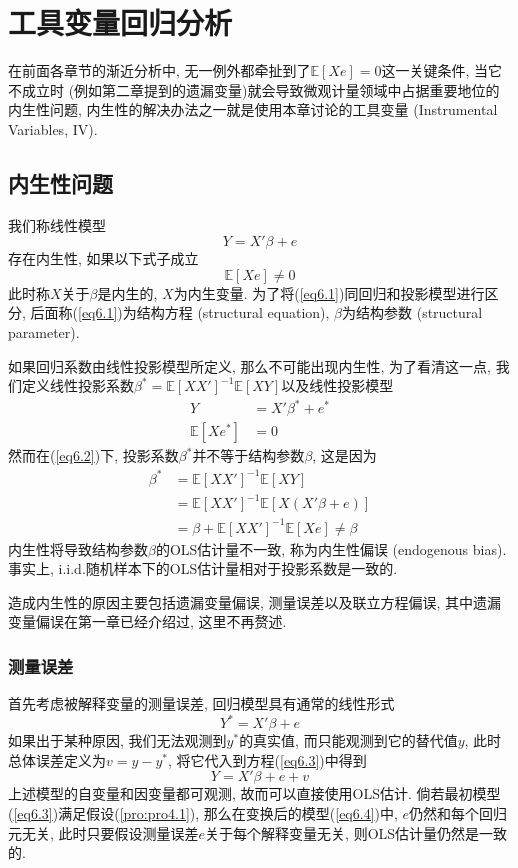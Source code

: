 \documentclass[cn, 12pt, math=mtpro2, bibstyle=apa, blue, twocol]{elegantbook}
\newcommand{\E}{\mathbb{E}}
\begin{document}
\chapter{工具变量回归分析}
在前面各章节的渐近分析中, 无一例外都牵扯到了$\E[Xe]=0$这一关键条件, 当它不成立时 (例如第二章提到的遗漏变量)就会导致微观计量领域中占据重要地位的内生性问题, 内生性的解决办法之一就是使用本章讨论的工具变量 (Instrumental Variables, IV).

\section{内生性问题}
我们称线性模型
\begin{equation}\label{eq6.1}
  Y=X'\beta+e
\end{equation}
存在内生性, 如果以下式子成立
\begin{equation*}\label{eq6.2}
  \E[Xe]\neq0
\end{equation*}
此时称$X$关于$\beta$是内生的, $X$为内生变量. 为了将(\ref{eq6.1})同回归和投影模型进行区分, 后面称(\ref{eq6.1})为结构方程 (structural equation), $\beta$为结构参数 (structural parameter).

如果回归系数由线性投影模型所定义, 那么不可能出现内生性, 为了看清这一点, 我们定义线性投影系数$\beta^\ast=\E[XX']^{-1}\E[XY]$以及线性投影模型
\begin{align*}
Y&=X'\beta^\ast+e^\ast \\
\E[Xe^\ast]&=0
\end{align*}
然而在(\ref{eq6.2})下, 投影系数$\beta^\ast$并不等于结构参数$\beta$, 这是因为
\begin{align}
\beta^\ast&=\E[XX']^{-1}\E[XY] \nonumber \\
&=\E[XX']^{-1}\E[X(X'\beta+e)] \nonumber \\
&=\beta+\E[XX']^{-1}\E[Xe]\neq\beta \label{eq6.6}
\end{align}
内生性将导致结构参数$\beta$的OLS估计量不一致, 称为内生性偏误 (endogenous bias). 事实上, i.i.d.随机样本下的OLS估计量相对于投影系数是一致的.

造成内生性的原因主要包括遗漏变量偏误, 测量误差以及联立方程偏误, 其中遗漏变量偏误在第一章已经介绍过, 这里不再赘述.
\subsection{测量误差}
首先考虑被解释变量的测量误差, 回归模型具有通常的线性形式
\begin{equation}\label{eq6.3}
  Y^\ast=X'\beta+e
\end{equation}
如果出于某种原因, 我们无法观测到$y^\ast$的真实值, 而只能观测到它的替代值$y$, 此时总体误差定义为$v=y-y^\ast$, 将它代入到方程(\ref{eq6.3})中得到
\begin{equation}\label{eq6.4}
  Y=X'\beta+e+v
\end{equation}
上述模型的自变量和因变量都可观测, 故而可以直接使用OLS估计. 倘若最初模型(\ref{eq6.3})满足假设(\ref{pro:pro4.1}), 那么在变换后的模型(\ref{eq6.4})中, $e$仍然和每个回归元无关, 此时只要假设测量误差$e$关于每个解释变量无关, 则OLS估计量仍然是一致的.
\end{document}
